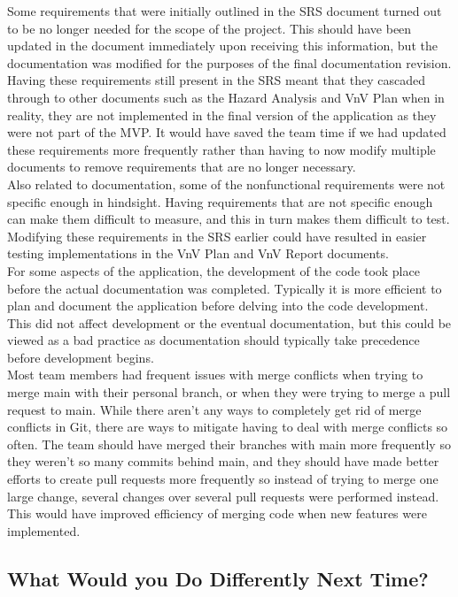 \documentclass{article}
\begin{document}
\noindent Some requirements that were initially outlined in the SRS document turned out to be no longer needed for the scope of the project. This should
have been updated in the document immediately upon receiving this information, but the documentation was modified for the purposes of the final
documentation revision. Having these requirements still present in the SRS meant that they cascaded through to other documents such as the Hazard Analysis
and VnV Plan when in reality, they are not implemented in the final version of the application as they were not part of the MVP. It would have saved the
team time if we had updated these requirements more frequently rather than having to now modify multiple documents to remove requirements that are no longer
necessary.\\
\noindent Also related to documentation, some of the nonfunctional requirements were not specific enough in hindsight. Having requirements that are not
specific enough can make them difficult to measure, and this in turn makes them difficult to test. Modifying these requirements in the SRS earlier could
have resulted in easier testing implementations in the VnV Plan and VnV Report documents.\\

\noindent For some aspects of the application, the development of the code took place before the actual documentation was completed. Typically it is more
efficient to plan and document the application before delving into the code development. This did not affect development or the eventual documentation, but
this could be viewed as a bad practice as documentation should typically take precedence before development begins.\\

\noindent Most team members had frequent issues with merge conflicts when trying to merge main with their personal branch, or when they were trying to merge
a pull request to main. While there aren't any ways to completely get rid of merge conflicts in Git, there are ways to mitigate having to deal with merge
conflicts so often. The team should have merged their branches with main more frequently so they weren't so many commits behind main, and they should have
made better efforts to create pull requests more frequently so instead of trying to merge one large change, several changes over several pull requests were
performed instead. This would have improved efficiency of merging code when new features were implemented.

\subsection{What Would you Do Differently Next Time?}
\end{document}
